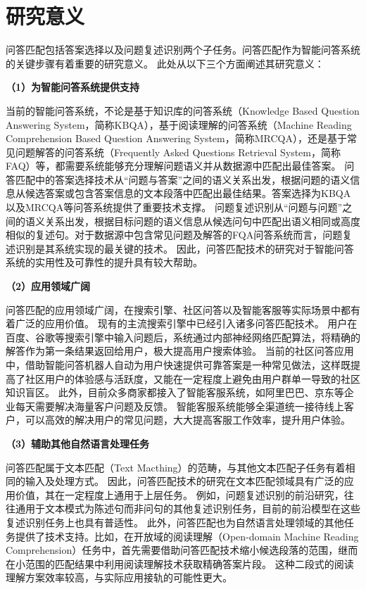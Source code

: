 \section{研究意义}
问答匹配包括答案选择以及问题复述识别两个子任务。问答匹配作为智能问答系统的关键步骤有着重要的研究意义。
此处从以下三个方面阐述其研究意义：

\textbf{\songti（1）为智能问答系统提供支持}

当前的智能问答系统，不论是基于知识库的问答系统（Knowledge Based Question Answering System，简称KBQA），基于阅读理解的问答系统（Machine Reading Comprehension Based Question Answering System，简称MRCQA），还是基于常见问题解答的问答系统（Frequently Asked Questions Retrieval System，简称FAQ）等，都需要系统能够充分理解问题语义并从数据源中匹配出最佳答案。
问答匹配中的答案选择技术从“问题与答案”之间的语义关系出发，根据问题的语义信息从候选答案或包含答案信息的文本段落中匹配出最佳结果。答案选择为KBQA以及MRCQA等问答系统提供了重要技术支撑。
问题复述识别从“问题与问题”之间的语义关系出发，根据目标问题的语义信息从候选问句中匹配出语义相同或高度相似的复述句。对于数据源中包含常见问题及解答的FQA问答系统而言，问题复述识别是其系统实现的最关键的技术。
因此，问答匹配技术的研究对于智能问答系统的实用性及可靠性的提升具有较大帮助。

\textbf{\songti（2）应用领域广阔}

问答匹配的应用领域广阔，在搜索引擎、社区问答以及智能客服等实际场景中都有着广泛的应用价值。
现有的主流搜索引擎中已经引入诸多问答匹配技术。
用户在百度、谷歌等搜索引擎中输入问题后，系统通过内部神经网络匹配算法，将精确的解答作为第一条结果返回给用户，极大提高用户搜索体验。
当前的社区问答应用中，借助智能问答机器人自动为用户快速提供可靠答案是一种常见做法，这样既提高了社区用户的体验感与活跃度，又能在一定程度上避免由用户群单一导致的社区知识盲区。
此外，目前众多商家都接入了智能客服系统，如阿里巴巴、京东等企业每天需要解决海量客户问题及反馈。
智能客服系统能够全渠道统一接待线上客户，可以高效的解决用户的常见问题，大大提高客服工作效率，提升用户体验。

\textbf{\songti（3）辅助其他自然语言处理任务}

问答匹配属于文本匹配（Text Macthing）的范畴，与其他文本匹配子任务有着相同的输入及处理方式。
因此，问答匹配技术的研究在文本匹配领域具有广泛的应用价值，其在一定程度上通用于上层任务。
例如，问题复述识别的前沿研究，往往通用于文本模式为陈述句而非问句的其他复述识别任务，目前的前沿模型在这些复述识别任务上也具有普适性。
此外，问答匹配也为自然语言处理领域的其他任务提供了技术支持。比如，在开放域的阅读理解（Open-domain Machine Reading Comprehension）任务中，首先需要借助问答匹配技术缩小候选段落的范围，继而在小范围的匹配结果中利用阅读理解技术获取精确答案片段。
这种二段式的阅读理解方案效率较高，与实际应用接轨的可能性更大。

